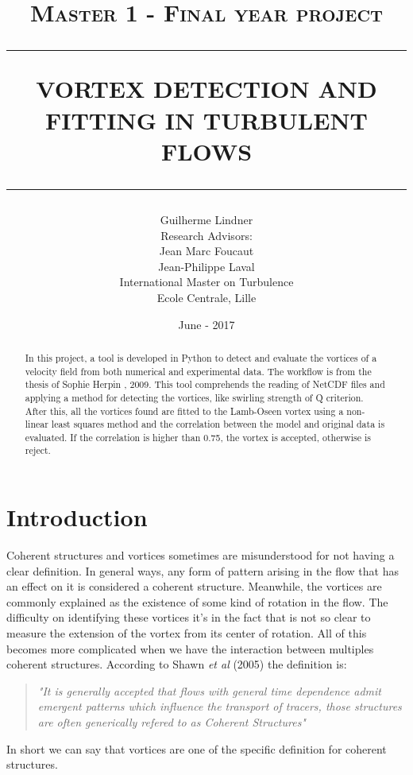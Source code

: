 \documentclass[12pt, a4paper, openany]{memoir}
\title{ \normalsize \textsc{Master 1 - Final year project}
	\\ [2.0cm]
	\hrule
	\vspace{0.5cm}
	\LARGE \textbf{\uppercase{Vortex detection and fitting in turbulent flows}} \\ [0.5cm]
	\hrule
	\vspace{0.5cm}
	\normalsize  \vspace*{5\baselineskip}}
\date{\vfill June - 2017}
\author{
	\Large Guilherme Lindner \\ [1.0cm]
	Research Advisors: \\
	Jean Marc Foucaut \\
	Jean-Philippe Laval  \\ [1.0cm]
	International Master on Turbulence\\ [0.2cm]
	Ecole Centrale, Lille \\}
\begin{document}
	
	\maketitle
	\thispagestyle{empty}
	\let\cleardoublepage\clearpage
	\frontmatter
	\begin{abstract}
		In this project, a tool is developed in Python to detect and evaluate the vortices of a velocity field from both numerical and experimental data. The workflow is from the thesis of Sophie Herpin \cite{herpin2009}, 2009.
		This tool comprehends the reading of NetCDF files and applying a method for detecting the vortices, like swirling strength of Q criterion. After this, all the vortices found are fitted to the Lamb-Oseen vortex using a non-linear least squares method and the correlation between the model and original data is evaluated. If the correlation is higher than 0.75, the vortex is accepted, otherwise is reject.
	\end{abstract}
	\newpage
	\tableofcontents
	\newpage
	\listoftables
	\newpage
	\listoffigures

    \mainmatter

\chapter*{Introduction}
Coherent structures and vortices sometimes are misunderstood for not having a clear definition. In general ways, any form of pattern arising in the flow that has an effect on it is considered a coherent structure. Meanwhile, the vortices are commonly explained as the existence of some kind of rotation in the flow. The difficulty on identifying these vortices it's in the fact that is not so clear to measure the extension of the vortex from its center of rotation. All of this becomes more complicated when we have the interaction between multiples coherent structures. According to Shawn \textit{et al} (2005) \cite{shawn2005} the definition is:
\begin{quote}
	\textit{"It is generally accepted that flows with general time dependence admit emergent patterns which influence the transport of tracers, those structures are often generically refered to as Coherent Structures"}
\end{quote}

In short we can say that vortices are one of the specific definition for coherent structures.
\end{document}
